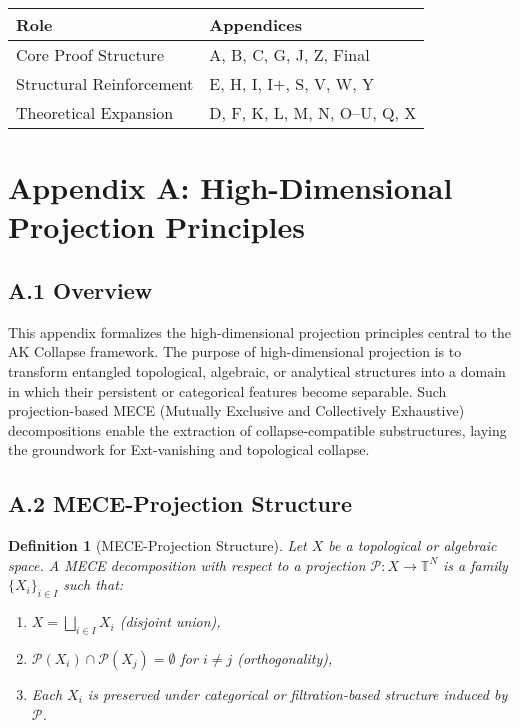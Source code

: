 \documentclass[11pt]{article}
\newtheorem{definition}[theorem]{Definition}
\begin{document}
\vspace{1em}

\begin{center}
\begin{tabular}{ll}
\toprule
\textbf{Role} & \textbf{Appendices} \\
\midrule
Core Proof Structure & A, B, C, G, J, Z, Final \\
Structural Reinforcement & E, H, I, I$+$, S, V, W, Y \\
Theoretical Expansion & D, F, K, L, M, N, O--U, Q, X \\
\bottomrule
\end{tabular}
\end{center}



\section*{Appendix A: High-Dimensional Projection Principles}

\subsection*{A.1 Overview}

This appendix formalizes the high-dimensional projection principles central to the AK Collapse framework. The purpose of high-dimensional projection is to transform entangled topological, algebraic, or analytical structures into a domain in which their persistent or categorical features become separable.  
Such projection-based MECE (Mutually Exclusive and Collectively Exhaustive) decompositions enable the extraction of collapse-compatible substructures, laying the groundwork for Ext-vanishing and topological collapse.

\subsection*{A.2 MECE-Projection Structure}

\begin{definition}[MECE-Projection Structure]
Let $X$ be a topological or algebraic space. A MECE decomposition with respect to a projection $\mathcal{P}: X \to \mathbb{T}^N$ is a family $\{X_i\}_{i \in I}$ such that:
\begin{enumerate}
  \item $X = \bigsqcup_{i \in I} X_i$ (disjoint union),
  \item $\mathcal{P}(X_i) \cap \mathcal{P}(X_j) = \emptyset$ for $i \ne j$ (orthogonality),
  \item Each $X_i$ is preserved under categorical or filtration-based structure induced by $\mathcal{P}$.
\end{enumerate}
\end{definition}
\end{document}
